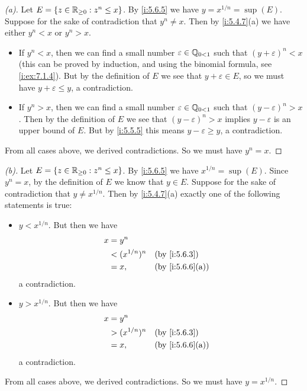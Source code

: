 \begin{proof}[(a)]
  Let \(E = \left\lbrace z \in \mathbb{R}_{\geq 0} : z^n \leq x\right\rbrace\).
  By \cref{i:5.6.5} we have \(y = x^{1 / n} = \sup(E)\).
  Suppose for the sake of contradiction that \(y^n \neq x\).
  Then by \cref{i:5.4.7}(a) we have either \(y^n < x\) or \(y^n > x\).
  \begin{itemize}
    \item If \(y^n < x\), then we can find a small number \(\varepsilon \in \mathbb{Q}_{0 < 1}\) such that \((y + \varepsilon)^n < x\)
          (this can be proved by induction, and using the binomial formula, see \cref{i:ex:7.1.4}).
          But by the definition of \(E\) we see that \(y + \varepsilon \in E\), so we must have \(y + \varepsilon \leq y\), a contradiction.
    \item If \(y^n > x\), then we can find a small number \(\varepsilon \in \mathbb{Q}_{0 < 1}\) such that \((y - \varepsilon)^n > x\).
          Then by the definition of \(E\) we see that \((y - \varepsilon)^n > x\) implies \(y - \varepsilon\) is an upper bound of \(E\).
          But by \cref{i:5.5.5} this means \(y - \varepsilon \geq y\), a contradiction.
  \end{itemize}
  From all cases above, we derived contradictions.
  So we must have \(y^n = x\).
\end{proof}

\begin{proof}[(b)]
  Let \(E = \left\lbrace z \in \mathbb{R}_{\geq 0} : z^n \leq x\right\rbrace\).
  By \cref{i:5.6.5} we have \(x^{1 / n} = \sup(E)\).
  Since \(y^n = x\), by the definition of \(E\) we know that \(y \in E\).
  Suppose for the sake of contradiction that \(y \neq x^{1 / n}\).
  Then by \cref{i:5.4.7}(a) exactly one of the following statements is true:
  \begin{itemize}
    \item \(y < x^{1 / n}\).
          But then we have
          \begin{align*}
            x & = y^n                                \\
              & < (x^{1 / n})^n &  & \by{i:5.6.3}    \\
              & = x,            &  & \by{i:5.6.6}[a]
          \end{align*}
          a contradiction.
    \item \(y > x^{1 / n}\).
          But then we have
          \begin{align*}
            x & = y^n                                \\
              & > (x^{1 / n})^n &  & \by{i:5.6.3}    \\
              & = x,            &  & \by{i:5.6.6}[a]
          \end{align*}
          a contradiction.
  \end{itemize}
  From all cases above, we derived contradictions.
  So we must have \(y = x^{1 / n}\).
\end{proof}

